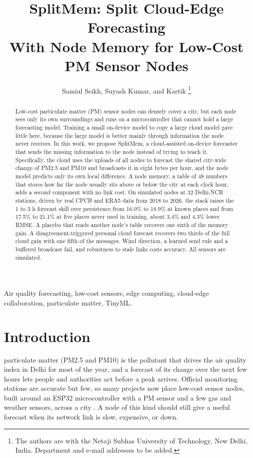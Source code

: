 \documentclass[journal]{IEEEtran}
\title{SplitMem: Split Cloud-Edge Forecasting\\ With Node Memory for Low-Cost PM Sensor Nodes}
\author{Samiul Seikh, Suyash Kumar, and Kartik%
\thanks{The authors are with the Netaji Subhas University of Technology, New Delhi, India. Department and e-mail addresses to be added.}}
\begin{document}
\maketitle

\begin{abstract}
Low-cost particulate matter (PM) sensor nodes can densely cover a city, but each node sees only its own surroundings and runs on a microcontroller that cannot hold a large forecasting model. Training a small on-device model to copy a large cloud model gave little here, because the large model is better mainly through information the node never receives. In this work, we propose SplitMem, a cloud-assisted on-device forecaster that sends the missing information to the node instead of trying to teach it. Specifically, the cloud uses the uploads of all nodes to forecast the shared city-wide change of PM2.5 and PM10 and broadcasts it in eight bytes per hour, and the node model predicts only its own local difference. A node memory, a table of 48 numbers that stores how far the node usually sits above or below the city at each clock hour, adds a second component with no link cost. On simulated nodes at 32 Delhi-NCR stations, driven by real CPCB and ERA5 data from 2018 to 2026, the stack raises the 1 to 3 h forecast skill over persistence from 16.0\% to 18.9\% at known places and from 17.5\% to 21.1\% at five places never used in training, about 3.4\% and 4.3\% lower RMSE. A placebo that reads another node's table recovers one sixth of the memory gain. A disagreement-triggered personal cloud forecast recovers two thirds of the full cloud gain with one fifth of the messages. Wind direction, a learned send rule and a buffered broadcast fail, and robustness to stale links costs accuracy. All sensors are simulated.
\end{abstract}

\begin{IEEEkeywords}
Air quality forecasting, low-cost sensors, edge computing, cloud-edge collaboration, particulate matter, TinyML.
\end{IEEEkeywords}

\section{Introduction}
 particulate matter (PM2.5 and PM10) is the pollutant that drives the air quality index in Delhi for most of the year, and a forecast of its change over the next few hours lets people and authorities act before a peak arrives. Official monitoring stations are accurate but few, so many projects now place low-cost sensor nodes, built around an ESP32 microcontroller with a PM sensor and a few gas and weather sensors, across a city \cite{an2025gta,illueca2024zoning}. A node of this kind should still give a useful forecast when its network link is slow, expensive, or down.
\end{document}
